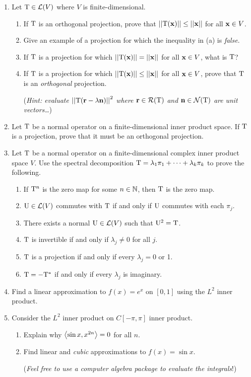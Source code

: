 \begin{exercises}
\begin{enumerate}
		
		\item Let $\mathrm{T}\in\mathcal{L}(V)$ where $V$ is finite-dimensional.
		\begin{enumerate}
		  \item If $\mathrm{T}$ is an orthogonal projection, prove that $\left| \left| \mathrm{T}({\mathbf{x}})\right|\right|\le\left| \left| {\mathbf{x}}\right|\right|$ for all ${\mathbf{x}}\in V$.
		 	\item Give an example of a projection for which the inequality in (a) is \emph{false.}
		 	\item If $\mathrm{T}$ is a projection for which $\left| \left| \mathrm{T}({\mathbf{x}})\right|\right|=\left| \left| {\mathbf{x}}\right|\right|$ for all ${\mathbf{x}}\in V$, what is $\mathrm{T}$?
		 	\item If $\mathrm{T}$ is a projection for which $\left| \left| \mathrm{T}({\mathbf{x}})\right|\right|\le\left| \left| {\mathbf{x}}\right|\right|$ for all ${\mathbf{x}}\in V$, prove that $\mathrm{T}$ is an \emph{orthogonal} projection.\par
		 	(\emph{Hint: evaluate $\left| \left| \mathrm{T}({\mathbf{r}}-\lambda{\mathbf{n}})\right|\right|^2$ where ${\mathbf{r}}\in \mathcal{R}(\mathrm{T})$ and ${\mathbf{n}}\in\mathcal{N}(\mathrm{T})$ are unit vectors\ldots})
		\end{enumerate}
		
		
		\item Let $\mathrm{T}$ be a normal operator on a finite-dimensional inner product space. If $\mathrm{T}$ is a projection, prove that it must be an orthogonal projection.
		
		
		\item\label{exs:lastqn} Let $\mathrm{T}$ be a normal operator on a finite-dimensional complex inner product space $V$. Use the spectral decomposition $\mathrm{T}=\lambda_1\pi_1+\cdots+\lambda_k\pi_k$ to prove the following.
		\begin{enumerate}
		  \item If $\mathrm{T}^n$ is the zero map for some $n\in\mathbb{N}$, then $\mathrm{T}$ is the zero map.
		  \item $\mathrm{U}\in\mathcal{L}(V)$ commutes with $\mathrm{T}$ if and only if $\mathrm{U}$ commutes with each $\pi_j$.
		  \item There exists a normal $\mathrm{U}\in\mathcal{L}(V)$ such that $\mathrm{U}^2=\mathrm{T}$.
		  \item $\mathrm{T}$ is invertible if and only if $\lambda_j\neq 0$ for all $j$.
		  \item $\mathrm{T}$ is a projection if and only if every $\lambda_j=0$ or 1.
		  \item $\mathrm{T}=-\mathrm{T}^*$ if and only if every $\lambda_j$ is imaginary.
		\end{enumerate}
		
		
		\item Find a linear approximation to $f(x)=e^x$ on $[0,1]$ using the $L^2$ inner product.
		
		
		\item Consider the $L^2$ inner product on $C[-\pi,\pi]$ inner product.
		\begin{enumerate}
		  \item Explain why $\left\langle \sin x,x^{2n}\right\rangle=0$ for all $n$.
		  \item Find linear and \emph{cubic} approximations to $f(x)=\sin x$.\par
		  (\emph{Feel free to use a computer algebra package to evaluate the integrals}!)
		\end{enumerate}
		

\end{enumerate}
\end{exercises}
